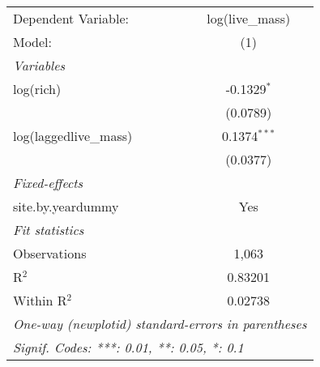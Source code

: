 \begin{tabular}{lc}
\tabularnewline\midrule\midrule
Dependent Variable:&log(live\_mass)\\
Model:&(1)\\
\midrule \emph{Variables}&  \\
log(rich)&-0.1329$^{*}$\\
  &(0.0789)\\
log(laggedlive\_mass)&0.1374$^{***}$\\
  &(0.0377)\\
\midrule \emph{Fixed-effects}&  \\
site.by.yeardummy & Yes\\
\midrule \emph{Fit statistics}&  \\
Observations & 1,063\\
R$^2$ & 0.83201\\
Within R$^2$ & 0.02738\\
\midrule\midrule\multicolumn{2}{l}{\emph{One-way (newplotid) standard-errors in parentheses}}\\
\multicolumn{2}{l}{\emph{Signif. Codes: ***: 0.01, **: 0.05, *: 0.1}}\\
\end{tabular}


